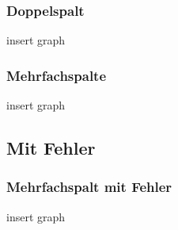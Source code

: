 \documentclass{beamer}
\begin{document}

\begin{frame}
  \frametitle{Doppelspalt}

insert graph\\

\end{frame}



\begin{frame}
  \frametitle{Mehrfachspalte}

insert graph\\

\end{frame}



\subsection{Mit Fehler}
\begin{frame}
  \frametitle{Mehrfachspalt mit Fehler}

insert graph\\


\end{frame}
\end{document}
